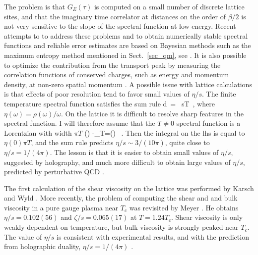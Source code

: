  The problem is that $G_E(\tau)$ is computed on a small number of 
discrete lattice sites, and that the imaginary time correlator 
at distances on the order of $\beta/2$ is not very sensitive to the 
slope of the spectral function at low energy. Recent attempts to 
to address these problems and to obtain numerically stable spectral 
functions and reliable error estimates are based on Bayesian methods
such as the maximum entropy method mentioned in Sect.~\ref{sec_qm}, 
see \cite{Aarts:2007wj,Aarts:2007va}. It is also possible to 
optimize the contribution from the transport peak by measuring 
the correlation functions of conserved charges, such as energy and 
momentum density, at non-zero spatial momentum 
\cite{Aarts:2006wt,Meyer:2008gt}. A possible issue with lattice 
calculations is that effects of poor resolution tend to favor small 
values of $\eta/s$. The finite temperature spectral function satisfies 
the sum rule \cite{Romatschke:2009ng}
\be 
{} \int d\omega\, 
  \left[ \eta(\omega) -\eta_{T\!=\!0}(\omega)\right] = 
  \, sT\, , 
\ee
where $\eta(\omega) = \rho(\omega)/\omega$. On the lattice it is 
difficult to resolve sharp features in the spectral function. I will
therefore assume that the $T\neq 0$ spectral function is a Lorentzian
with width $\pi T$
\be
\eta(\omega) -\eta_{T\!=}(\omega) \simeq
 \, . 
\ee
Then the integral on the lhs is equal to $\eta(0)\pi T$, and the sum
rule predicts $\eta/s\sim 3/(10\pi)$, quite close to $\eta/s=1/(4\pi)$. 
The lesson is that it is easier to obtain small values of $\eta/s$, 
suggested by holography, and much more difficult to obtain large
values of $\eta/s$, predicted by perturbative QCD \cite{Arnold:2000dr}. 

 The first calculation of the shear viscosity on the lattice was 
performed by Karsch and Wyld \cite{Karsch:1986cq}. More recently, the 
problem of computing the shear and and bulk viscosity in a pure gauge
plasma near $T_c$ was revisited by Meyer \cite{Meyer:2007ic,Meyer:2008gt}. 
He obtains $\eta/s=0.102(56)$ and $\zeta/s=0.065(17)$ at $T=1.24T_c$. Shear 
viscosity is only weakly dependent on temperature, but bulk viscosity is
strongly peaked near $T_c$. The value of $\eta/s$ is consistent with 
experimental results, and with the prediction from holographic duality,
$\eta/s=1/(4\pi)$ \cite{Kovtun:2004de}. 

 

